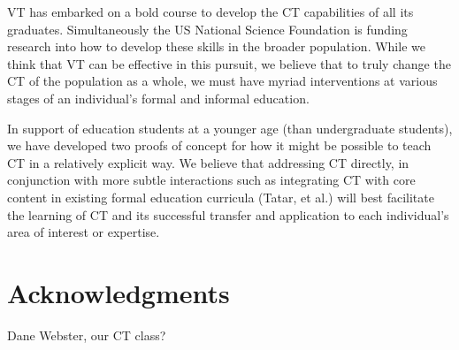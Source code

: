 \documentclass{acm_proc_article-sp}
\begin{document}
VT has embarked on a bold course to develop the CT capabilities of all its graduates. Simultaneously the US National Science Foundation is funding research into how to develop these skills in the broader population. While we think that VT can be effective in this pursuit, we believe that to truly change the CT of the population as a whole, we must have myriad interventions at various stages of an individual's formal and informal education.

In support of education students at a younger age (than undergraduate students), we have developed two proofs of concept for how it might be possible to teach CT in a relatively explicit way. We believe that addressing CT directly, in conjunction with more subtle interactions such as integrating CT with core content in existing formal education curricula (Tatar, et al.) will best facilitate the learning of CT and its successful transfer and application to each individual's area of interest or expertise.



\section{Acknowledgments}
Dane Webster, our CT class?
\end{document}
